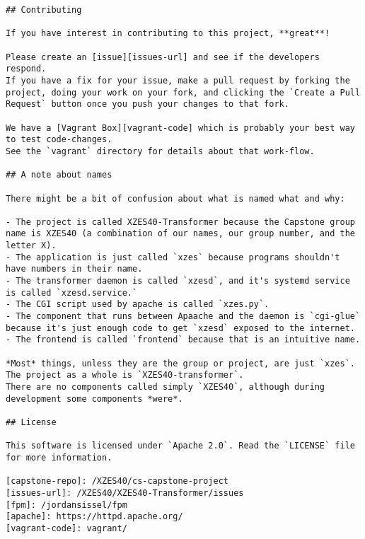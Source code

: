 \begin{lstlisting}
## Contributing

If you have interest in contributing to this project, **great**!

Please create an [issue][issues-url] and see if the developers respond.
If you have a fix for your issue, make a pull request by forking the project, doing your work on your fork, and clicking the `Create a Pull Request` button once you push your changes to that fork.

We have a [Vagrant Box][vagrant-code] which is probably your best way to test code-changes.
See the `vagrant` directory for details about that work-flow.

## A note about names

There might be a bit of confusion about what is named what and why:

- The project is called XZES40-Transformer because the Capstone group name is XZES40 (a combination of our names, our group number, and the letter X).
- The application is just called `xzes` because programs shouldn't have numbers in their name.
- The transformer daemon is called `xzesd`, and it's systemd service is called `xzesd.service.`
- The CGI script used by apache is called `xzes.py`.
- The component that runs between Apaache and the daemon is `cgi-glue` because it's just enough code to get `xzesd` exposed to the internet.
- The frontend is called `frontend` because that is an intuitive name.

*Most* things, unless they are the group or project, are just `xzes`.
The project as a whole is `XZES40-transformer`.
There are no components called simply `XZES40`, although during development some components *were*.

## License

This software is licensed under `Apache 2.0`. Read the `LICENSE` file for more information.

[capstone-repo]: /XZES40/cs-capstone-project
[issues-url]: /XZES40/XZES40-Transformer/issues
[fpm]: /jordansissel/fpm
[apache]: https://httpd.apache.org/
[vagrant-code]: vagrant/
\end{lstlisting}
